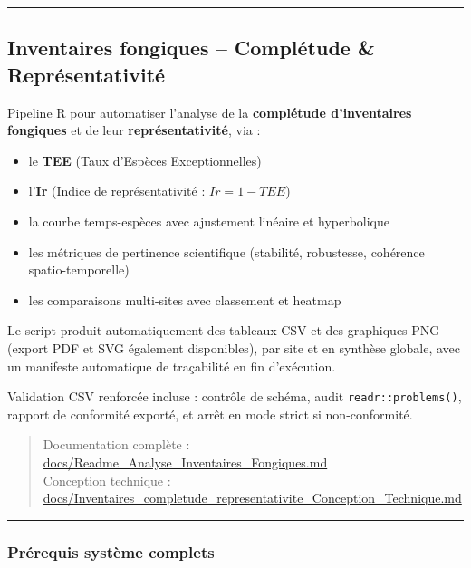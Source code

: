 \begin{center}\rule{0.5\linewidth}{0.5pt}\end{center}

\subsection{Inventaires fongiques -- Complétude \&
Représentativité}\label{inventaires-fongiques-compluxe9tude-repruxe9sentativituxe9}

Pipeline R pour automatiser l'analyse de la \textbf{complétude
d'inventaires fongiques} et de leur \textbf{représentativité}, via :

\begin{itemize}
\tightlist
\item
  le \textbf{TEE} (Taux d'Espèces Exceptionnelles)
\item
  l'\textbf{Ir} (Indice de représentativité : \(Ir = 1 - TEE\))
\item
  la courbe temps-espèces avec ajustement linéaire et hyperbolique
\item
  les métriques de pertinence scientifique (stabilité, robustesse,
  cohérence spatio-temporelle)
\item
  les comparaisons multi-sites avec classement et heatmap
\end{itemize}

Le script produit automatiquement des tableaux CSV et des graphiques PNG
(export PDF et SVG également disponibles), par site et en synthèse
globale, avec un manifeste automatique de traçabilité en fin
d'exécution.

Validation CSV renforcée incluse : contrôle de schéma, audit
\texttt{readr::problems()}, rapport de conformité exporté, et arrêt en
mode strict si non-conformité.

\begin{quote}
Documentation complète :
\url{docs/Readme_Analyse_Inventaires_Fongiques.md}\\
Conception technique :
\url{docs/Inventaires_completude_representativite_Conception_Technique.md}
\end{quote}

\begin{center}\rule{0.5\linewidth}{0.5pt}\end{center}

\subsubsection{Prérequis système
complets}\label{pruxe9requis-systuxe8me-complets}

